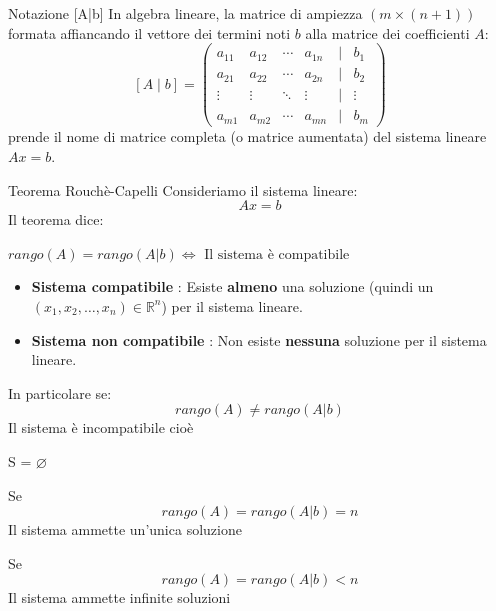 \begin{definition}{Notazione [A|b]}
In algebra lineare, la matrice di ampiezza $(m \times (n+1))$ formata affiancando il vettore dei termini noti $b$ alla matrice dei coefficienti $A$:
    $$[A \mid b] = \begin{pmatrix} a_{11} & a_{12} & \cdots & a_{1n} & \mid & b_1 \\ a_{21} & a_{22} & \cdots & a_{2n} & \mid & b_2 \\ \vdots & \vdots & \ddots & \vdots & \mid & \vdots \\ a_{m1} & a_{m2} & \cdots & a_{mn} & \mid & b_m \end{pmatrix}$$
prende il nome di matrice completa (o matrice aumentata) del sistema lineare $Ax = b$.
\end{definition}

\begin{theorem}{Teorema Rouchè-Capelli}
    Consideriamo il sistema lineare:
    \begin{equation}
        Ax = b
    \end{equation}
    Il teorema dice:
    \begin{center}
        $rango(A) = rango(A|b) \Leftrightarrow \text{ Il sistema è compatibile } $
    \end{center}
    \begin{itemize}
        \item \textbf{Sistema compatibile} : Esiste \textbf{almeno} una soluzione (quindi un $(x_1,x_2,\dots,x_n) \in \mathbb{R}^n$) 
        per il sistema lineare.
        \item \textbf{Sistema non compatibile} : Non esiste \textbf{nessuna} soluzione per il sistema lineare.
    \end{itemize}
    In particolare se:
    \begin{equation}
        rango(A) \neq rango(A|b)
    \end{equation}
    Il sistema è incompatibile cioè
    \begin{center}
        S = $\varnothing$
    \end{center}
    Se
    \begin{equation}
        rango(A) = rango(A|b) = n
    \end{equation}
    Il sistema ammette un'unica soluzione

    Se
    \begin{equation}
        rango(A) = rango(A|b) < n
    \end{equation}
    Il sistema ammette infinite soluzioni
\end{theorem}

